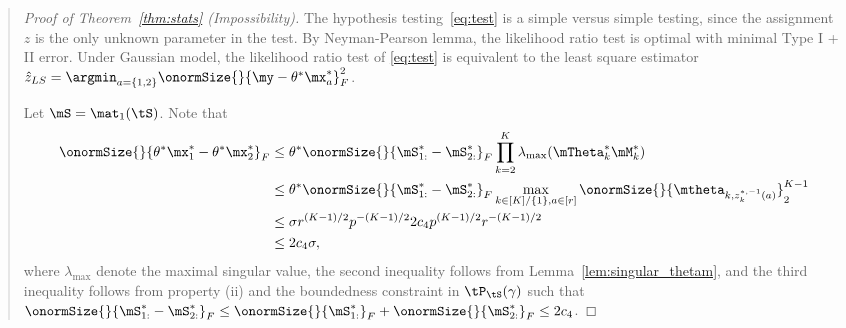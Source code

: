 \documentclass[11pt]{article}
\theoremstyle{definition}
\theoremstyle{definition}
\begin{document}
\begin{enumerate}
\begin{enumerate}[wide]
\begin{quote}
\begin{proof}[Proof of Theorem~\ref{thm:stats} (Impossibility)]
   The hypothesis testing~\eqref{eq:test} is a simple versus simple testing, since the assignment $z$ is the only unknown parameter in the test. 
   By Neyman-Pearson lemma, the likelihood ratio test is optimal with minimal Type I + II error. Under Gaussian model, the likelihood ratio test of \eqref{eq:test} is equivalent to the least square estimator $\hat z_{LS} = \argmin_{a = \{1,2\}} \onormSize{}{\my - \theta^* \mx_a^*}_F^2$. 
   
   Let $\mS = \mat_1(\tS)$. Note that 
   \begin{align}
       \onormSize{}{ \theta^* \mx_1^*  - \theta^* \mx_2^*}_F &\leq  \theta^* \onormSize{}{ \mS^*_{1:} - \mS^*_{2:} }_F \prod_{k = 2}^K \lambda_{\max}(\mTheta_k^*\mM_k^*)  \\
       & \leq \theta^* \onormSize{}{ \mS^*_{1:} - \mS^*_{2:} }_F   \max_{k \in [K]/\{1\}, a \in [r]} \onormSize{}{\mtheta_{k, z^{*, -1}_k(a)}}_2^{K-1} \\
       & \leq  \sigma r^{(K-1)/2} p^{-(K-1)/2} 2 c_4 p^{(K-1)/2} r^{-(K-1)/2}\\
       & \leq 2 c_4 \sigma, 
   \end{align}
   where $\lambda_{\max}$ denote the maximal singular value, the second inequality follows from Lemma~\ref{lem:singular_thetam}, and the third inequality follows from property (ii) and the boundedness constraint in $\tP_{\tS}(\gamma)$ such that $\onormSize{}{ \mS^*_{1:} - \mS^*_{2:} }_F  \leq \onormSize{}{\mS_{1:}^*}_F + \onormSize{}{\mS_{2:}^*}_F \leq 2c_4$.


\end{proof}
\end{quote}
\end{enumerate}
\end{enumerate}
\end{document}
